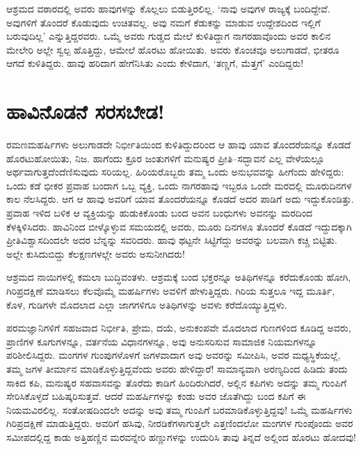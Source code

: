 ಆಶ್ರಮದ ವಠಾರದಲ್ಲಿ ಅವರು ಹಾವುಗಳನ್ನು ಕೊಲ್ಲಲು ಬಿಡುತ್ತಿರಲಿಲ್ಲ. ‘ನಾವು ಅವುಗಳ ರಾಜ್ಯಕ್ಕೆ ಬಂದಿದ್ದೇವೆ. ಅವುಗಳಿಗೆ ತೊಂದರೆ ಕೊಡುವುದು ಉಚಿತವಲ್ಲ. ಅವು ನಮಗೆ ಕೆಡುಕನ್ನು ಮಾಡುವ ಉದ್ದೇಶದಿಂದ ಇಲ್ಲಿಗೆ ಬರುವುದಿಲ್ಲ’ ಎನ್ನುತ್ತಿದ್ದರವರು. ಒಮ್ಮೆ ಅವರು ಗುಡ್ಡದ ಮೇಲೆ ಕುಳಿತಿದ್ದಾಗ ನಾಗರಹಾವೊಂದು ಅವರ ಕಾಲಿನ ಮೇಲೇರಿ ಅಲ್ಲೇ ಸ್ವಲ್ಪ ಹೊತ್ತಿದ್ದು, ಆಮೇಲೆ ಹೊರಟು ಹೋಯಿತು. ಅವರು ಕೊಂಚವೂ ಅಲುಗಾಡದೆ, ಭೀತರೂ ಆಗದೆ ಕುಳಿತಿದ್ದರು. ಹಾವು ಹರಿದಾಗ ಹೇಗೆನಿಸಿತು ಎಂದು ಕೇಳಿದಾಗ, ‘ತಣ್ಣಗೆ, ಮೆತ್ತಗೆ’ ಎಂದಿದ್ದರು!


\section*{ಹಾವಿನೊಡನೆ ಸರಸಬೇಡ!}


ರಮಣಮಹರ್ಷಿಗಳು ಅಲುಗಾಡದೇ ನಿರ್ಭೀತಿಯಿಂದ ಕುಳಿತಿದ್ದುದರಿಂದ ಆ ಹಾವು ಯಾವ ತೊಂದರೆಯನ್ನೂ ಕೊಡದೆ ಹೊರಟುಹೋಯಿತು, ನಿಜ. ಹಾಗೆಂದು ಕ್ರೂರ ಜಂತುಗಳಿಗೆ ಮನುಷ್ಯರ ಪ್ರೀತಿ–ಸದ್ಭಾವನೆ ಎಲ್ಲ ವೇಳೆಯಲ್ಲೂ ಅರ್ಥವಾಗುತ್ತದೆಂದೆಣಿಸುವುದು ಸರಿಯಲ್ಲ. ಹಿರಿಯರೊಬ್ಬರು ತಮ್ಮ ಒಂದು ಅನುಭವವನ್ನು ಹೀಗೆಂದು ಹೇಳಿದ್ದರು: ಒಂದು ಕಡೆ ಭೀಕರ ಪ್ರವಾಹ ಬಂದಾಗ ಒಬ್ಬ ವ್ಯಕ್ತಿ, ಒಂದು ನಾಗರಹಾವು ಇಬ್ಬರೂ ಒಂದೇ ಮರದಲ್ಲಿ ಮೂರುದಿನಗಳ ಕಾಲ ನೆಲಸಿದ್ದರು. ಆಗ ಆ ಹಾವು ಅವರಿಗೆ ಯಾವ ತೊಂದರೆಯನ್ನೂ ಕೊಡದೆ ಅದರ ಪಾಡಿಗೆ ಅದು ಇದ್ದುಕೊಂಡಿತ್ತು. ಪ್ರವಾಹ ಇಳಿದ ಬಳಿಕ ಆ ವ್ಯಕ್ತಿಯನ್ನು ಹುಡುಕಿಕೊಂಡು ಬಂದ ಅವನ ಬಂಧುಗಳು ಅವನನ್ನು ಮರದಿಂದ ಕೆಳಕ್ಕಿಳಿಸಿದರು. ಹಾವಿನಿಂದ ಬೀಳ್ಕೊಳ್ಳುವ ಸಮಯದಲ್ಲಿ ಅವರು, ಮೂರು ದಿನಗಳೂ ತೊಂದರೆ ಕೊಡದೆ ಇದ್ದುದಕ್ಕಾಗಿ ಪ್ರೀತಿವಿಶ್ವಾಸದಿಂದಲೇ ಅದರ ಬೆನ್ನನ್ನು ಸವರಿದರು. ಹಾವು ಥಟ್ಟನೇ ಸಿಟ್ಟಿಗೆದ್ದು ಅವರನ್ನು ಬಲವಾಗಿ ಕಚ್ಚಿ ಬಿಟ್ಟಿತು. ಅಲ್ಲೇ ಕುಸಿದುಬಿದ್ದು ಕೆಲಕ್ಷಣಗಳಲ್ಲೇ ಅವರು ಅಸುನೀಗಿದರು!

ಆಶ್ರಮದ ನಾಯಿಗಳಲ್ಲಿ ಕಮಲಾ ಬುದ್ಧಿವಂತಳು. ಆಶ್ರಮಕ್ಕೆ ಬಂದ ಭಕ್ತರನ್ನೂ ಅತಿಥಿಗಳನ್ನೂ ಕರೆದುಕೊಂಡು ಹೋಗಿ, ಗಿರಿಪ್ರದಕ್ಷಿಣೆ ಮಾಡಿಸಲು ಕೆಲವೊಮ್ಮೆ ಮಹರ್ಷಿಗಳು ಅವಳಿಗೆ ಹೇಳುತ್ತಿದ್ದರು. ಗಿರಿಯ ಸುತ್ತಲೂ ಇದ್ದ ಮೂರ್ತಿ, ಕೊಳ, ಗುಡಿಗಳೇ ಮೊದಲಾದ ಎಲ್ಲಾ ಜಾಗಗಳಿಗೂ ಅತಿಥಿಗಳನ್ನು ಅವಳು ಕರೆದೊಯ್ಯುತ್ತಿದ್ದಳು.

ಪರಮಜ್ಞಾನಿಗಳಿಗೆ ಸಹಜವಾದ ನಿರ್ಭೀತಿ, ಪ್ರೇಮ, ದಯೆ, ಅನುಕಂಪವೇ ಮೊದಲಾದ ಗುಣಗಳಿಂದ ಕೂಡಿದ್ದ ಅವರು, ಪ್ರಾಣಿಗಳ ಕೂಗುಗಳನ್ನೂ, ವರ್ತನೆಯ ವಿಧಾನಗಳನ್ನೂ, ಅವು ಅನುಸರಿಸುವ ಸಾಮಾಜಿಕ ನಿಯಮಗಳನ್ನೂ ಪರಿಶೀಲಿಸಿದ್ದರು. ಮಂಗಗಳ ಗುಂಪುಗಳೊಳಗೆ ಜಗಳವಾದಾಗ ಅವು ಅವರನ್ನು ಸಮೀಪಿಸಿ, ಅವರ ಮಧ್ಯಸ್ಥಿಕೆಯಲ್ಲೆ, ತಮ್ಮ ಜಗಳ ತೀರ್ಮಾನ ಮಾಡಿಕೊಳ್ಳುತ್ತಿದ್ದವೆಂದು ಅವರು ಹೇಳಿದ್ದಾರೆ! ಸಾಮಾನ್ಯವಾಗಿ ಅರಣ್ಯದಿಂದ ಹಿಡಿದು ತಂದು ಸಾಕಿದ ಕಪಿ, ಮನುಷ್ಯರ ಸಹವಾಸವನ್ನು ತೊರೆದು ಕಾಡಿಗೆ ಹಿಂದಿರುಗಿದರೆ, ಅಲ್ಲಿನ ಕಪಿಗಳು ಅದನ್ನು ತಮ್ಮ ಗುಂಪಿಗೆ ಸೇರಿಸಿಕೊಳ್ಳದೆ ಬಹಿಷ್ಕರಿಸುತ್ತವೆ. ಆದರೆ ಮಹರ್ಷಿಗಳನ್ನು ಕಂಡು ಅವರ ಜೊತೆಗಿದ್ದು ಬಂದ ಕಪಿಗೆ ಈ ನಿಯಮವಿರಲಿಲ್ಲ. ಸಂತೋಷದಿಂದಲೇ ಅದನ್ನು ಅವು ತಮ್ಮ ಗುಂಪಿಗೆ ಬರಮಾಡಿಕೊಳ್ಳುತ್ತಿದ್ದವು! ಒಮ್ಮೆ ಮಹರ್ಷಿಗಳು ಗಿರಿಪ್ರದಕ್ಷಿಣೆ ಮಾಡುತ್ತಿದ್ದರು. ಅವರಿಗೆ ಹಸಿವು, ನೀರಡಿಕೆಗಳಾಗುತ್ತಲೇ ಎತ್ತಣಿಂದಲೋ ಮಂಗಗಳ ಗುಂಪೊಂದು ಅವರ ಸಮೀಪದಲ್ಲಿದ್ದ ಕಾಡು ಅತ್ತಿಹಣ್ಣಿನ ಮರವನ್ನೇರಿ ಹಣ್ಣುಗಳನ್ನು ಉದುರಿಸಿ ತಾವು ತಿನ್ನದೆ ಅಲ್ಲಿಂದ ಹೊರಟು ಹೋದವು!

